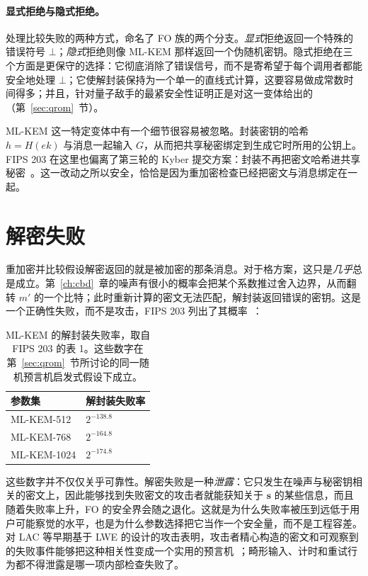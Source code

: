 \paragraph{显式拒绝与隐式拒绝。}
处理比较失败的两种方式，命名了 FO 族的两个分支。\emph{显式}拒绝返回一个特殊的错误符号 $\bot$；\emph{隐式}拒绝则像 ML-KEM 那样返回一个伪随机密钥。隐式拒绝在三个方面是更保守的选择：它彻底消除了错误信号，而不是寄希望于每个调用者都能安全地处理 $\bot$；它使解封装保持为一个单一的直线式计算，这要容易做成常数时间得多；并且，针对量子敌手的最紧安全性证明正是对这一变体给出的（第~\ref{sec:qrom}~节）。

ML-KEM 这一特定变体中有一个细节很容易被忽略。封装密钥的哈希 $h = H(ek)$ 与消息一起输入 $G$，从而把共享秘密绑定到生成它时所用的公钥上。FIPS 203 在这里也偏离了第三轮的 Kyber 提交方案：封装不再把密文哈希进共享秘密~\cite{fips203}。这一改动之所以安全，恰恰是因为重加密检查已经把密文与消息绑定在一起。

\section{解密失败}

重加密并比较假设解密返回的就是被加密的那条消息。对于格方案，这只是\emph{几乎}总是成立。第~\ref{ch:cbd}~章的噪声有很小的概率会把某个系数推过舍入边界，从而翻转 $m'$ 的一个比特；此时重新计算的密文无法匹配，解封装返回错误的密钥。这是一个正确性失败，而不是攻击，FIPS 203 列出了其概率~\cite{fips203}：

\begin{table}[H]
\centering
\begin{tabular}{ll}
\toprule
\textbf{参数集} & \textbf{解封装失败率} \\
\midrule
ML-KEM-512  & $2^{-138.8}$ \\
ML-KEM-768  & $2^{-164.8}$ \\
ML-KEM-1024 & $2^{-174.8}$ \\
\bottomrule
\end{tabular}
\caption{ML-KEM 的解封装失败率，取自 FIPS 203 的表 1。这些数字在第~\ref{sec:qrom}~节所讨论的同一随机预言机启发式假设下成立。}
\label{tab:mlkem-failure}
\end{table}

这些数字并不仅仅关乎可靠性。解密失败是一种\emph{泄露}：它只发生在噪声与秘密钥相关的密文上，因此能够找到失败密文的攻击者就能获知关于 $\mathbf{s}$ 的某些信息，而且随着失败率上升，FO 的安全界会随之退化。这就是为什么失败率被压到远低于用户可能察觉的水平，也是为什么参数选择把它当作一个安全量，而不是工程容差。对 LAC 等早期基于 LWE 的设计的攻击表明，攻击者精心构造的密文和可观察到的失败事件能够把这种相关性变成一个实用的预言机~\cite{laccca2019}；畸形输入、计时和重试行为都不得泄露是哪一项内部检查失败了。

